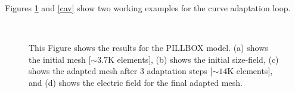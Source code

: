 \documentclass[review,authoryear,12pt]{elsarticle_summary_report}
\begin{document}
Figures \ref{pill} and \ref{cav} show two working examples for the curve adaptation loop.
\begin{landscape}
\begin{figure}[ph!]
\centering
{}
\hspace*{50pt}
\\
\hspace*{50pt}
\caption{\label{pill} This Figure shows the results for the PILLBOX model. (a) shows the initial mesh [$\sim3.7\text{K}$ elements], (b) shows the initial size-field, (c) shows the adapted mesh after 3 adaptation steps [$\sim14\text{K}$ elements], and (d) shows the electric field for the final adapted mesh.}
\end{figure}
\end{landscape}
\end{document}
